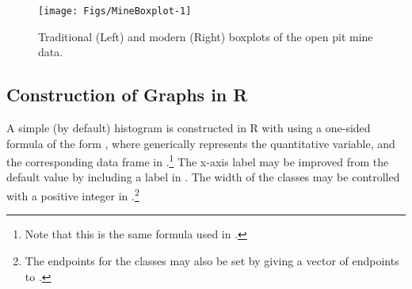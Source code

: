 \documentclass[10pt,openany]{book}\usepackage[]{graphicx}\usepackage[]{color}
\newenvironment{knitrout}{}{} %
\begin{document}
\begin{knitrout}
\color{fgcolor}\begin{figure}[hbtp]

{\centering \texttt{[image: Figs/MineBoxplot-1]} 

}

\caption[Traditional (Left) and modern (Right) boxplots of the open pit mine data]{Traditional (Left) and modern (Right) boxplots of the open pit mine data.}\label{fig:MineBoxplot}
\end{figure}


\end{knitrout}


\subsection{Construction of Graphs in R}
A simple (by default) histogram is constructed in R with  using a one-sided formula of the form , where  generically represents the quantitative variable, and the corresponding data frame in .\footnote{Note that this is the same formula used in .} The x-axis label may be improved from the default value by including a label in . The width of the classes may be controlled with a positive integer in .\footnote{The endpoints for the classes may also be set by giving a vector of endpoints to .}
\end{document}
